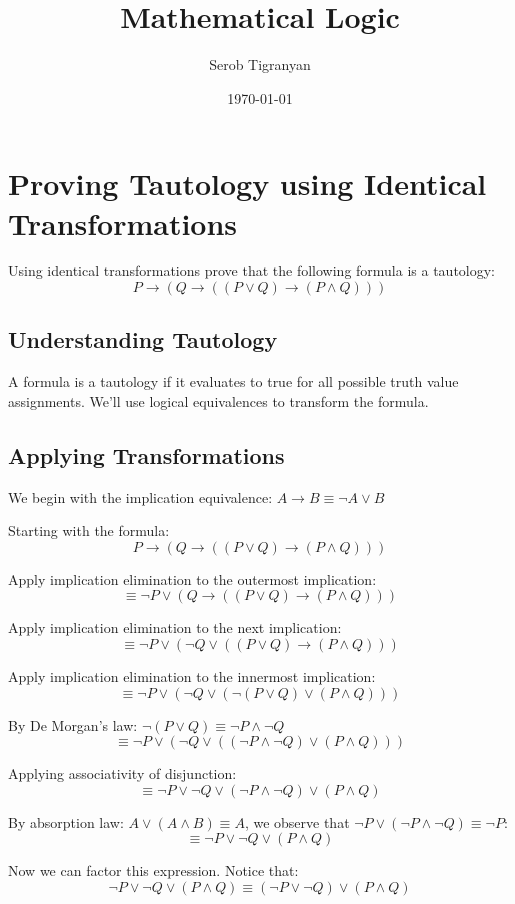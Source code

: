\documentclass[11pt]{article}
\author{Serob Tigranyan}
\date{\today}
\title{Mathematical Logic}
\begin{document}
\maketitle
\tableofcontents

\newpage
\section{Proving Tautology using Identical Transformations}
\label{sec:org75aa0fe}
Using identical transformations prove that the following formula is a tautology:
\[
P \to (Q \to ((P \lor Q) \to (P \land Q)))
\]
\subsection{Understanding Tautology}
\label{sec:org7bbe7ff}
A formula is a tautology if it evaluates to true for all possible truth value assignments. We'll use logical equivalences to transform the formula.
\subsection{Applying Transformations}
\label{sec:org6ea30ab}
We begin with the implication equivalence: \(A \to B \equiv \neg A \lor B\)

Starting with the formula:
\[
P \to (Q \to ((P \lor Q) \to (P \land Q)))
\]

Apply implication elimination to the outermost implication:
\[
\equiv \neg P \lor (Q \to ((P \lor Q) \to (P \land Q)))
\]

Apply implication elimination to the next implication:
\[
\equiv \neg P \lor (\neg Q \lor ((P \lor Q) \to (P \land Q)))
\]

Apply implication elimination to the innermost implication:
\[
\equiv \neg P \lor (\neg Q \lor (\neg(P \lor Q) \lor (P \land Q)))
\]

By De Morgan's law: \(\neg(P \lor Q) \equiv \neg P \land \neg Q\)
\[
\equiv \neg P \lor (\neg Q \lor ((\neg P \land \neg Q) \lor (P \land Q)))
\]

\newpage
Applying associativity of disjunction:
\[
\equiv \neg P \lor \neg Q \lor (\neg P \land \neg Q) \lor (P \land Q)
\]

By absorption law: \(A \lor (A \land B) \equiv A\), we observe that \(\neg P \lor (\neg P \land \neg Q) \equiv \neg P\):
\[
\equiv \neg P \lor \neg Q \lor (P \land Q)
\]

Now we can factor this expression. Notice that:
\[
\neg P \lor \neg Q \lor (P \land Q) \equiv (\neg P \lor \neg Q) \lor (P \land Q)
\]
\end{document}
